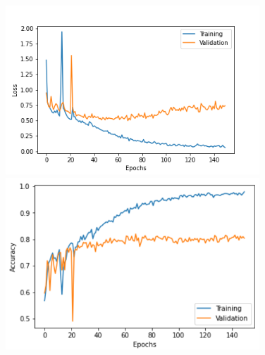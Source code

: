 \documentclass[aspectratio=1610, 9pt]{beamer}
\begin{document}
\begin{frame}
  \begin{figure}
    \centering
    \begin{minipage}{0.46\textwidth}
      \includegraphics[width=0.85\textwidth]{images/loss.png}
    \end{minipage}
    \begin{minipage}{0.46\textwidth}
      \includegraphics[width=0.85\textwidth]{images/acc.png}
    \end{minipage}
  \end{figure}
\end{frame}
\end{document}
